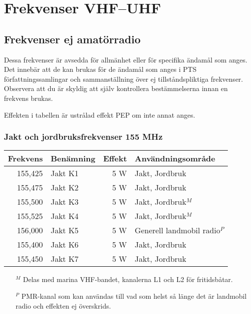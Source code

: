 \section{Frekvenser VHF--UHF}

\subsection{Frekvenser ej amatörradio}

Dessa frekvenser är avsedda för allmänhet eller för specifika ända\-mål som anges. Det innebär att de kan brukas för de ändamål som anges i PTS för\-fatt\-nings\-sam\-ling\-ar och sammanställning över ej tillståndspliktiga frekvenser. Observera att du är skyldig att själv kontrollera bestämmelserna
innan en frekvens brukas.

Effekten i tabellen är ustrålad effekt PEP om inte annat anges.

\subsubsection{Jakt och jordbruksfrekvenser 155 MHz}
\begin{longtable}{rlrl}
\textbf{Frekvens} & \textbf{Benämning} & \textbf{Effekt} & \textbf{Användningsområde}   \\ \hline \endhead
155,425           & Jakt K1            & 5 W             & Jakt, Jordbruk               \\
155,475           & Jakt K2            & 5 W             & Jakt, Jordbruk               \\
155,500           & Jakt K3            & 5 W             & Jakt, Jordbruk$^M$           \\
155,525           & Jakt K4            & 5 W             & Jakt, Jordbruk$^M$           \\
156,000           & Jakt K5            & 5 W             & Generell landmobil radio$^P$ \\
155,400           & Jakt K6            & 5 W             & Jakt, Jordbruk               \\
155,450           & Jakt K7            & 5 W             & Jakt, Jordbruk
\end{longtable}

\footnotesize
\begin{itemize}
	\item[$^M$] Delas med marina VHF-bandet, kanalerna L1 och L2 för fritidsbåtar.
	\item[$^P$] PMR-kanal som kan användas till vad som helst så länge det är landmobil radio och effekten ej överskrids.
\end{itemize}
\normalsize

